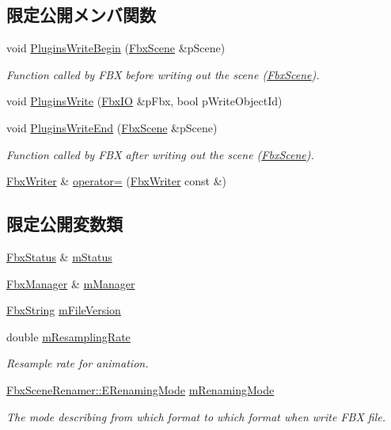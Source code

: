 \subsection*{限定公開メンバ関数}
\begin{DoxyCompactItemize}
\item 
void \hyperlink{class_fbx_writer_a33b44e856c07510bddf658fd446789d1}{Plugins\+Write\+Begin} (\hyperlink{class_fbx_scene}{Fbx\+Scene} \&p\+Scene)
\begin{DoxyCompactList}\small\item\em Function called by F\+BX before writing out the scene (\hyperlink{class_fbx_scene}{Fbx\+Scene}). \end{DoxyCompactList}\item 
void \hyperlink{class_fbx_writer_aeca3bf711e9fb1815c90b3423773010d}{Plugins\+Write} (\hyperlink{class_fbx_i_o}{Fbx\+IO} \&p\+Fbx, bool p\+Write\+Object\+Id)
\item 
void \hyperlink{class_fbx_writer_a85e89b71d39755ef0a426aa7b35221d6}{Plugins\+Write\+End} (\hyperlink{class_fbx_scene}{Fbx\+Scene} \&p\+Scene)
\begin{DoxyCompactList}\small\item\em Function called by F\+BX after writing out the scene (\hyperlink{class_fbx_scene}{Fbx\+Scene}). \end{DoxyCompactList}\item 
\hyperlink{class_fbx_writer}{Fbx\+Writer} \& \hyperlink{class_fbx_writer_a7f56d9a174cfde0ab7815135b2c5f3c1}{operator=} (\hyperlink{class_fbx_writer}{Fbx\+Writer} const \&)
\end{DoxyCompactItemize}
\subsection*{限定公開変数類}
\begin{DoxyCompactItemize}
\item 
\hyperlink{class_fbx_status}{Fbx\+Status} \& \hyperlink{class_fbx_writer_a57ea7c7d264738b21442e7abb19c4e14}{m\+Status}
\item 
\hyperlink{class_fbx_manager}{Fbx\+Manager} \& \hyperlink{class_fbx_writer_acd9ad280af8eef03970ed9ada774a731}{m\+Manager}
\item 
\hyperlink{class_fbx_string}{Fbx\+String} \hyperlink{class_fbx_writer_a134d9a05d8c34cae98d3c782b98ea801}{m\+File\+Version}
\item 
double \hyperlink{class_fbx_writer_a9fac62b1b3e302d2c690cea379df3d33}{m\+Resampling\+Rate}
\begin{DoxyCompactList}\small\item\em Resample rate for animation. \end{DoxyCompactList}\item 
\hyperlink{class_fbx_scene_renamer_a9279ee1a645d6499b934adbc376f8678}{Fbx\+Scene\+Renamer\+::\+E\+Renaming\+Mode} \hyperlink{class_fbx_writer_a473140b1c3e8af555f5e51ff883420eb}{m\+Renaming\+Mode}
\begin{DoxyCompactList}\small\item\em The mode describing from which format to which format when write F\+BX file. \end{DoxyCompactList}\end{DoxyCompactItemize}
